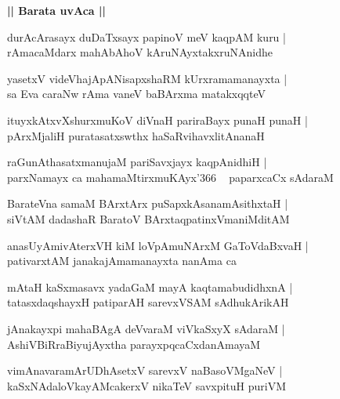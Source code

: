 \documentclass[twoside,12pt,openright]{book}
\newcounter{shloka}[chapter]
\def\uvaca#1{\centerline{{\large\textbf{#1}}}}
\begin{document}
\uvaca{|| Barata uvAca ||}

\begin{shloka}%
durAcArasayx duDaTxsayx papinoV meV kaqpAM kuru |\\
rAmacaMdarx mahAbAhoV kAruNAyxtakxruNAnidhe
\end{shloka}

\begin{shloka}%
yasetxV videVhajApANisapxshaRM kUrxramamanayxta |\\
sa Eva caraNw rAma vaneV baBArxma matakxqqteV
\end{shloka}

\begin{shloka}%
ituyxkAtxvXshurxmuKoV diVnaH pariraBayx punaH punaH |\\
pArxMjaliH puratasatxswthx haSaRvihavxlitAnanaH
\end{shloka}

\begin{shloka}%
raGunAthasatxmanujaM pariSavxjayx kaqpAnidhiH |\\
parxNamayx ca mahamaMtirxmuKAyx\char'366 ~ paparxcaCx sAdaraM 
\end{shloka}

\begin{shloka}%
BarateVna samaM BArxtArx puSapxkAsanamAsithxtaH |\\
siVtAM dadashaR BaratoV BArxtaqpatinxVmaniMditAM 
\end{shloka}

\begin{shloka}%
anasUyAmivAterxVH kiM loVpAmuNArxM GaToVdaBxvaH |\\
pativarxtAM janakajAmamanayxta nanAma ca 
\end{shloka}

\begin{shloka}%
mAtaH kaSxmasavx yadaGaM mayA kaqtamabudidhxnA |\\
tatasxdaqshayxH patiparAH sarevxVSAM sAdhukArikAH 
\end{shloka}

\begin{shloka}%
jAnakayxpi mahaBAgA deVvaraM viVkaSxyX sAdaraM |\\
AshiVBiRraBiyujAyxtha parayxpqcaCxdanAmayaM 
\end{shloka}

\begin{shloka}%
vimAnavaramArUDhAsetxV sarevxV naBasoVMgaNeV |\\
kaSxNAdaloVkayAMcakerxV nikaTeV savxpituH puriVM
\end{shloka}
\end{document}
